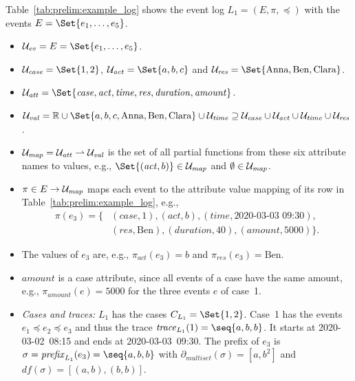 \begin{example}
	\label{ex:prelim:event_log}
	Table~\ref{tab:prelim:example_log} shows the event log $L_1 = (E, \pi, \preceq)$ with the events $E = \Set{e_1, \dots, e_5}$.

	\begin{itemize}
		\item $\U{ev} = E = \Set{e_1, \dots, e_5}$.
		
		\item $\U{case} = \Set{1, 2}$, $\U{act} = \Set{a, b, c}$ and $\U{res} = \Set{\text{Anna}, \text{Ben}, \text{Clara}}$.
		
		\item $\U{att} = \Set{\mathit{case}, \mathit{act}, \mathit{time}, \mathit{res}, \mathit{duration}, \mathit{amount}}$.
		
		\item $\U{val} = \R \cup \Set{a, b, c, \text{Anna}, \text{Ben}, \text{Clara}} \cup \U{time} \supseteq \U{case} \cup \U{act} \cup \U{time} \cup \U{res}$.
		
		\item $\mathcal{U}_{\mathit{map}} = \mathcal{U}_{\mathit{att}} \rightharpoonup \mathcal{U}_{\mathit{val}}$ is the set of all partial functions from these six attribute names to values, e.g., $\Set{(\mathit{act}, b)} \in \U{map}$ and $\emptyset \in \mathcal{U}_{\mathit{map}}$.
		
		\item $\pi \in E \to \mathcal{U}_{\mathit{map}}$ maps each event to the attribute value mapping of its row in Table~\ref{tab:prelim:example_log}, e.g.,
			\[
		\begin{aligned}
			\pi(e_3) = \{ & (\mathit{case}, 1), (\mathit{act}, b), (\mathit{time}, \text{2020-03-03 09:30}), \\
			              & (\mathit{res}, \text{Ben}), (\mathit{duration}, 40), (\mathit{amount}, 5000)\}.
		\end{aligned}
			\]
		\item The values of $e_3$ are, e.g., $\pi_{\mathit{act}}(e_3) = b$ and $\pi_{\mathit{res}}(e_3) = \text{Ben}$.
		
		\item $\mathit{amount}$ is a case attribute, since all events of a case have the same amount, e.g., $\pi_{\mathit{amount}}(e) = 5000$ for the three events $e$ of case~1.

		\item \emph{Cases and traces:} $L_1$ has the cases $C_{L_1} = \Set{1, 2}$. Case~1 has the events $e_1 \preceq e_2 \preceq e_3$ and thus the trace $\mathit{trace}_{L_1}(1) = \seq{a, b, b}$. It starts at \mbox{2020-03-02 08:15} and ends at \mbox{2020-03-03 09:30}. The prefix of $e_3$ is $\sigma = \mathit{prefix}_{L_1}(e_3) = \seq{a, b, b}$ with $\partial_{\mathit{multiset}}(\sigma) = [a, b^2]$ and $\mathit{df}(\sigma) = [(a, b), (b, b)]$.
	\end{itemize}



	
\end{example}

